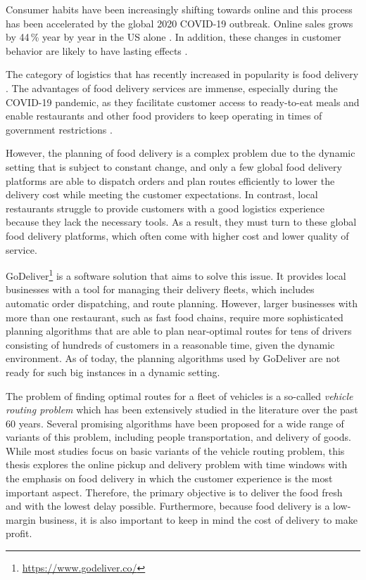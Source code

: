 Consumer habits have been increasingly shifting towards online and this process has been accelerated by the global 2020 COVID-19 outbreak. Online sales grows by 44\,\% year by year in the US alone \cite{ecommerce-growth}. In addition, these changes in customer behavior are likely to have lasting effects \cite{UNCTAD}. 

The category of logistics that has recently increased in popularity is food delivery \cite{food-delivery-statista}. The advantages of food delivery services are immense, especially during the COVID-19 pandemic, as they facilitate customer access to ready-to-eat meals and enable restaurants and other food providers to keep operating in times of government restrictions \cite{food-delivery}.

However, the planning of food delivery is a complex problem due to the dynamic setting that is subject to constant change, and only a few global food delivery platforms are able to dispatch orders and plan routes efficiently to lower the delivery cost while meeting the customer expectations. In contrast, local restaurants struggle to provide customers with a good logistics experience because they lack the necessary tools. As a result, they must turn to these global food delivery platforms, which often come with higher cost and lower quality of service.

GoDeliver\footnote{\url{https://www.godeliver.co/}} is a software solution that aims to solve this issue. It provides local businesses with a tool for managing their delivery fleets, which includes automatic order dispatching, and route planning. However, larger businesses with more than one restaurant, such as fast food chains, require more sophisticated planning algorithms that are able to plan near-optimal routes for tens of drivers consisting of hundreds of customers in a reasonable time, given the dynamic environment. As of today, the planning algorithms used by GoDeliver are not ready for such big instances in a dynamic setting.

The problem of finding optimal routes for a fleet of vehicles is a so-called \emph{vehicle routing problem} which has been extensively studied in the literature over the past 60 years. Several promising algorithms have been proposed for a wide range of variants of this problem, including people transportation, and delivery of goods. While most studies focus on basic variants of the vehicle routing problem, this thesis explores the online pickup and delivery problem with time windows with the emphasis on food delivery in which the customer experience is the most important aspect. Therefore, the primary objective is to deliver the food fresh and with the lowest delay possible. Furthermore, because food delivery is a low-margin business, it is also important to keep in mind the cost of delivery to make profit.

